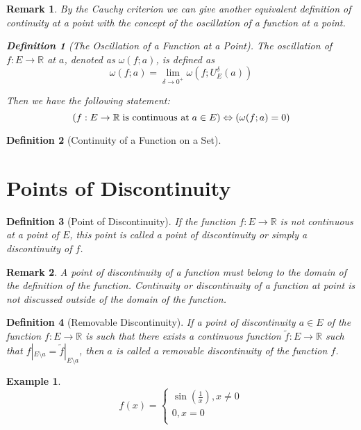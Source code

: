 \documentclass[onecolumn]{ctexart}
\newtheorem{definition}{Definition}
\newtheorem{remark}{Remark}
\newtheorem{example}{Example}
\begin{document}
\begin{remark}
  By the Cauchy criterion we can give another equivalent definition of 
  continuity at a point with the concept of the oscillation of a function at a 
  point.
  \begin{definition}[The Oscillation of a Function at a Point]
    The oscillation of $f:E \to \mathbb{R}$ at $a$, denoted as $\omega(f;a)$, is defined as
    \begin{equation}
      \omega(f;a) = \lim_{\delta \to 0^+} \omega(f;U_E^\delta(a))
    \end{equation}
  \end{definition}
  Then we have the following statement:
  \[
    (f:E \to \mathbb{R} \thickspace \textnormal{is continuous at} \thickspace a \in E) \Leftrightarrow
    (\omega(f;a) = 0)
  \]
\end{remark}

\begin{definition}[Continuity of a Function on a Set]
  
\end{definition}

\section{Points of Discontinuity}

\begin{definition}[Point of Discontinuity]
  If the function $f: E \to \mathbb{R}$ is not continuous at a point of $E$, 
  this point is called a point of discontinuity or simply a discontinuity of $f$.
\end{definition}
\begin{remark}
  A point of discontinuity of a function must belong to the domain of the 
  definition of the function. Continuity or discontinuity of a function at point 
  is not discussed outside of the domain of the function.
\end{remark}

\begin{definition}[Removable Discontinuity]
  If a point of discontinuity $a \in E$ of the function $f: E \to \mathbb{R}$ is 
  such that there exists a continuous function $\tilde{f}: E \to \mathbb{R}$ 
  such that $f|_{E \setminus a} = \tilde{f}|_{E \setminus a}$, then $a$ is 
  called a removable discontinuity of the function $f$.
\end{definition}

\begin{example}
  \[
    f(x) = 
    \begin{cases}
      \sin(\frac{1}{x}), x \neq 0 \\
      0, x = 0 \\
    \end{cases}
  \]
\end{example}
\end{document}
